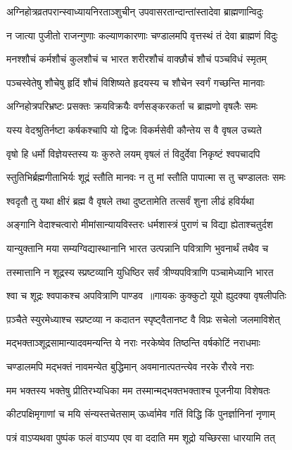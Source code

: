 \twolineshloka
{अग्निहोत्रव्रतपरान्स्वाध्यायनिरताञ्शुचीन्}
{उपवासरतान्दान्तांस्तादेवा ब्राह्मणान्विदुः}


\twolineshloka
{न जात्या पुजीतो राजन्गुणाः कल्याणकारणाः}
{चण्डालमपि वृत्तस्थं तं देवा ब्राह्मणं विदुः}


\twolineshloka
{मनश्शौचं कर्मशौचं कुलशौचं च भारत}
{शरीरशौचं वाक्छौचं शौचं पञ्चविधं स्मृतम्}


\twolineshloka
{पञ्चस्वेतेषु शौचेषु हृदिं शौचं विशिष्यते}
{हृदयस्य च शौचेन स्वर्गं गच्छन्ति मानवाः}


\twolineshloka
{अग्निहोत्रपरिभ्रष्टः प्रसक्तः क्रयविक्रयैः}
{वर्णसङ्करकर्ता च ब्राह्मणो वृषलैः समः}


\twolineshloka
{यस्य वेदश्रुतिर्नष्टा कर्षकश्चापि यो द्विजः}
{विकर्मसेवी कौन्तेय स वै वृषल उच्यते}


\twolineshloka
{वृषो हि धर्मो विज्ञेयस्तस्य यः कुरुते लयम्}
{वृषलं तं विदुर्देवा निकृष्टं श्वपचादपि}


\twolineshloka
{स्तुतिभिर्ब्रह्मगीताभिर्यः शूद्रं स्तौति मानवः}
{न तु मां स्तौति पापात्मा स तु चण्डालतः समः}


\twolineshloka
{श्वदृतौ तु यथा क्षीरं ब्रह्म वै वृषले तथा}
{दुष्टतामेति तत्सर्वं शुना लीढं हविर्यथा}


\twolineshloka
{अङ्गानि वेदाश्चत्वारो मीमांसान्यायविस्तरः}
{धर्मशास्त्रं पुराणं च विद्या ह्येताश्चतुर्दश}


\twolineshloka
{यान्युक्तानि मया सम्यग्विद्यास्थानानि भारत}
{उत्पन्नानि पवित्राणि भुवनार्थं तथैव च}


\threelineshloka
{तस्मात्तानि न शूद्रस्य स्प्रष्टव्यानि युधिष्ठिर}
{सर्वं त्रीण्यपवित्राणि पञ्चामेध्यानि भारत}
{}


\twolineshloka
{श्वा च शूद्रः श्वपाकश्च अपवित्राणि पाण्डव ॥गायकः कुक्कुटो यूपो ह्युदक्या वृषलीपतिः}
{}


\twolineshloka
{प़ञ्चैते स्युरमेध्याश्च स्प्रष्टव्या न कदातन}
{स्पृष्ट्वैतानष्ट वै विप्रः सचेलो जलमाविशेत्}


\twolineshloka
{मद्भक्ताञ्शूद्रसामान्यादवमन्यन्ति ये नराः}
{नरकेष्वेव तिष्ठन्ति वर्षकोटिं नराधमाः}


\twolineshloka
{चण्डालमपि मद्भक्तं नावमन्येत बुद्धिमान्}
{अवमानात्पतन्त्येव नरके रौरवे नराः}


\twolineshloka
{मम भक्तस्य भक्तेषु प्रीतिरभ्यधिका मम}
{तस्मान्मद्भक्तभक्ताश्च पूजनीया विशेषतः}


\twolineshloka
{कीटपक्षिमृगाणां च मयि संन्यस्तचेतसाम्}
{ऊर्ध्वामेव गतिं विद्धि किं पुनर्ज्ञानिनां नृणाम्}


\twolineshloka
{पत्रं वाऽप्यथवा पुष्पंक फलं वाऽप्यप एव वा}
{ददाति मम शूद्रो यच्छिरसा धारयामि तत्}


